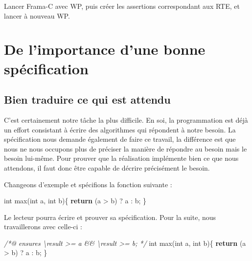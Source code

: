 \documentclass[12pt,francais,]{scrbook}
\newenvironment{Shaded}{}{}
\newcommand{\KeywordTok}[1]{\textcolor[rgb]{0.00,0.44,0.13}{\textbf{{#1}}}}
\newcommand{\DataTypeTok}[1]{\textcolor[rgb]{0.56,0.13,0.00}{{#1}}}
\newcommand{\CommentTok}[1]{\textcolor[rgb]{0.38,0.63,0.69}{\textit{{#1}}}}
\newcommand{\NormalTok}[1]{{#1}}
\begin{document}
\og{}Lancer Frama-C avec WP, puis créer les assertions correspondant aux
RTE, et lancer à nouveau WP\fg{}.

\section{De l'importance d'une bonne
spécification}\label{de-limportance-dune-bonne-spuxe9cification}

\subsection{Bien traduire ce qui est
attendu}\label{bien-traduire-ce-qui-est-attendu}

C'est certainement notre tâche la plus difficile. En soi, la
programmation est déjà un effort consistant à écrire des algorithmes qui
répondent à notre besoin. La spécification nous demande également de
faire ce travail, la différence est que nous ne nous occupons plus de
préciser la manière de répondre au besoin mais le besoin lui-même. Pour
prouver que la réalisation implémente bien ce que nous attendons, il
faut donc être capable de décrire précisément le besoin.

Changeons d'exemple et spécifions la fonction suivante :

\begin{footnotesize}\begin{Shaded}
\begin{Highlighting}[]
\DataTypeTok{int} \NormalTok{max(}\DataTypeTok{int} \NormalTok{a, }\DataTypeTok{int} \NormalTok{b)\{}
  \KeywordTok{return} \NormalTok{(a > b) ? a : b;}
\NormalTok{\}}
\end{Highlighting}
\end{Shaded}\end{footnotesize}

Le lecteur pourra écrire et prouver sa spécification. Pour la suite,
nous travaillerons avec celle-ci :

\begin{footnotesize}\begin{Shaded}
\begin{Highlighting}[]
\CommentTok{/*@}
\CommentTok{  ensures \textbackslash{}result >= a && \textbackslash{}result >= b;}
\CommentTok{*/}
\DataTypeTok{int} \NormalTok{max(}\DataTypeTok{int} \NormalTok{a, }\DataTypeTok{int} \NormalTok{b)\{}
  \KeywordTok{return} \NormalTok{(a > b) ? a : b;}
\NormalTok{\}}
\end{Highlighting}
\end{Shaded}\end{footnotesize}
\end{document}
